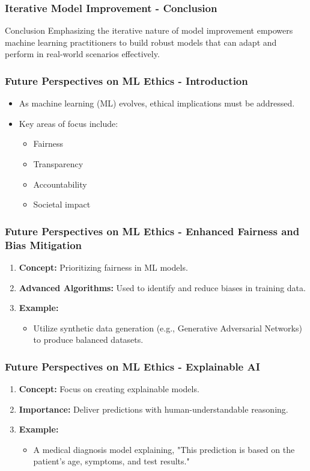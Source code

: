 \documentclass[aspectratio=169]{beamer}
\begin{document}
\begin{frame}[fragile]
    \frametitle{Iterative Model Improvement - Conclusion}
    \begin{block}{Conclusion}
        Emphasizing the iterative nature of model improvement empowers machine learning practitioners to build robust models that can adapt and perform in real-world scenarios effectively.
    \end{block}
\end{frame}

\begin{frame}[fragile]
  \frametitle{Future Perspectives on ML Ethics - Introduction}
  \begin{itemize}
    \item As machine learning (ML) evolves, ethical implications must be addressed.
    \item Key areas of focus include:
    \begin{itemize}
      \item Fairness
      \item Transparency
      \item Accountability
      \item Societal impact
    \end{itemize}
  \end{itemize}
\end{frame}

\begin{frame}[fragile]
  \frametitle{Future Perspectives on ML Ethics - Enhanced Fairness and Bias Mitigation}
  \begin{enumerate}
    \item \textbf{Concept:} Prioritizing fairness in ML models.
    \item \textbf{Advanced Algorithms:} Used to identify and reduce biases in training data.
    \item \textbf{Example:} 
    \begin{itemize}
      \item Utilize synthetic data generation (e.g., Generative Adversarial Networks) to produce balanced datasets.
    \end{itemize}
  \end{enumerate}
\end{frame}

\begin{frame}[fragile]
  \frametitle{Future Perspectives on ML Ethics - Explainable AI}
  \begin{enumerate}
    \item \textbf{Concept:} Focus on creating explainable models.
    \item \textbf{Importance:} Deliver predictions with human-understandable reasoning.
    \item \textbf{Example:} 
    \begin{itemize}
      \item A medical diagnosis model explaining, "This prediction is based on the patient's age, symptoms, and test results."
    \end{itemize}
  \end{enumerate}
\end{frame}
\end{document}

